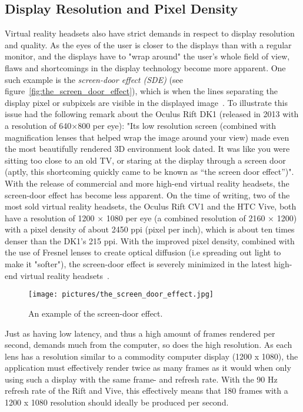 \subsection{Display Resolution and Pixel Density}
Virtual reality headsets also have strict demands in respect to display resolution and quality. As the eyes of the user is closer
to the displays than with a regular monitor, and the displays have to "wrap around" the user's whole field of view, flaws and shortcomings in the display technology 
become more apparent. 
One such example is the \textit{screen-door effect (SDE)} (see figure~\vref{fig:the_screen_door_effect}), 
which is when the lines separating the display pixel or subpixels are visible in the displayed image~\citep{TC2016}. 
To illustrate this issue \citet{TC2016} had the following remark about the Oculus Rift DK1 (released in 2013 with a resolution of 640×800 per eye):
"Its low resolution screen (combined with magnification lenses that helped wrap the image around your view) made even the most beautifully rendered 3D environment look dated. 
It was like you were sitting too close to an old TV, or staring at the display through a screen door (aptly, this shortcoming quickly came to be known as “the screen door effect”)".
With the release of commercial and more high-end virtual reality headsets, the screen-door effect has become less apparent.
On the time of writing, two of the most sold virtual reality headsets, the Oculus Rift CV1 and the HTC Vive, both have a resolution of 1200 × 1080 per eye (a combined 
resolution of 2160 × 1200) with a pixel density of about 2450 ppi (pixel per inch), which is about ten times denser than the DK1's 215 ppi. 
With the improved pixel density, combined with the use of Fresnel lenses to create optical diffusion (i.e spreading out light to make it "softer"), 
the screen-door effect is severely minimized in the latest high-end virtual reality headsets~\citep{Davies2016}. 

\begin{figure}%
	\texttt{[image: pictures/the\_screen\_door\_effect.jpg]}
	\caption[The screen-door effect]{An example of the screen-door effect.}
	\label{fig:the_screen_door_effect}
\end{figure} 

Just as having low latency, and thus a high amount of frames rendered per second, demands much from the computer, so does the high resolution.
As each lens has a resolution similar to a commodity computer display (1200 x 1080), the application must effectively render twice as many frames
as it would when only using such a display with the same frame- and refresh rate. With the 90 Hz refresh rate of the Rift and Vive, this effectively means
that 180 frames with a 1200 x 1080 resolution should ideally be produced per second.  

